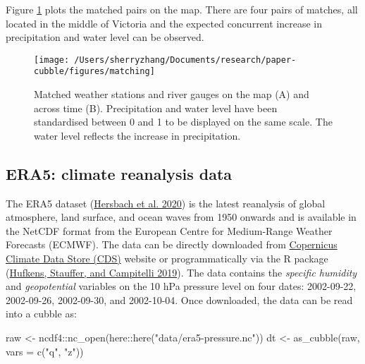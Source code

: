 \documentclass{article}
\newenvironment{Shaded}{\begin{snugshade}}{\end{snugshade}}
\newcommand{\AttributeTok}[1]{\textcolor[rgb]{0.77,0.63,0.00}{#1}}
\newcommand{\FunctionTok}[1]{\textcolor[rgb]{0.00,0.00,0.00}{#1}}
\newcommand{\NormalTok}[1]{#1}
\newcommand{\OtherTok}[1]{\textcolor[rgb]{0.56,0.35,0.01}{#1}}
\newcommand{\SpecialCharTok}[1]{\textcolor[rgb]{0.00,0.00,0.00}{#1}}
\newcommand{\StringTok}[1]{\textcolor[rgb]{0.31,0.60,0.02}{#1}}
\begin{document}
Figure \ref{fig:matching} plots the matched pairs on the map. There are four pairs of matches, all located in the middle of Victoria and the expected concurrent increase in precipitation and water level can be observed.

\begin{figure}
\texttt{[image: /Users/sherryzhang/Documents/research/paper-cubble/figures/matching]} \caption{Matched weather stations and river gauges on the map (A) and across time (B). Precipitation and water level have been standardised between 0 and 1 to be displayed on the same scale. The water level reflects the increase in precipitation.}\label{fig:matching}
\end{figure}

\hypertarget{era5-climate-reanalysis-data}{%
\subsection{ERA5: climate reanalysis data}\label{era5-climate-reanalysis-data}}

The ERA5 dataset (\protect\hyperlink{ref-hersbach2020era5}{Hersbach et al. 2020}) is the latest reanalysis of global atmosphere, land surface, and ocean waves from 1950 onwards and is available in the NetCDF format from the European Centre for Medium-Range Weather Forecasts (ECMWF). The data can be directly downloaded from \href{https://cds.climate.copernicus.eu/cdsapp\#!/dataset/reanalysis-era5-pressure-levels?tab=overview}{Copernicus Climate Data Store (CDS)} website or programmatically via the R package  (\protect\hyperlink{ref-ecwmfr}{Hufkens, Stauffer, and Campitelli 2019}). The  data contains the \emph{specific humidity} and \emph{geopotential} variables on the 10 hPa pressure level on four dates: 2002-09-22, 2002-09-26, 2002-09-30, and 2002-10-04. Once downloaded, the data can be read into a cubble as:

\begin{Shaded}
\begin{Highlighting}[]
\NormalTok{raw }\OtherTok{\textless{}{-}}\NormalTok{ ncdf4}\SpecialCharTok{::}\FunctionTok{nc\_open}\NormalTok{(here}\SpecialCharTok{::}\FunctionTok{here}\NormalTok{(}\StringTok{"data/era5{-}pressure.nc"}\NormalTok{))}
\NormalTok{dt }\OtherTok{\textless{}{-}} \FunctionTok{as\_cubble}\NormalTok{(raw, }\AttributeTok{vars =} \FunctionTok{c}\NormalTok{(}\StringTok{"q"}\NormalTok{, }\StringTok{"z"}\NormalTok{))}
\end{Highlighting}
\end{Shaded}
\end{document}
